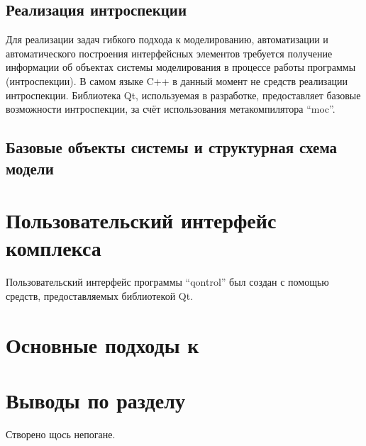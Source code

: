 \subsection{Реализация интроспекции}  %

Для реализации задач гибкого подхода к моделированию, автоматизации
и автоматического построения интерфейсных элементов
требуется получение информации об объектах системы моделирования
в процессе работы программы (интроспекции).
В самом языке C++ в данный момент не средств реализации интроспекции.
Библиотека Qt, используемая в разработке, предоставляет
базовые возможности интроспекции, за счёт использования метакомпилятора ``moc''.



\subsection{Базовые объекты системы и структурная схема модели}  %







\section{Пользовательский интерфейс комплекса} %

Пользовательский интерфейс программы ``qontrol'' был создан с помощью
средств, предоставляемых библиотекой Qt.



\section{Основные подходы к } %


\section{Выводы по разделу \thechapter} %

Створено щось непогане.



